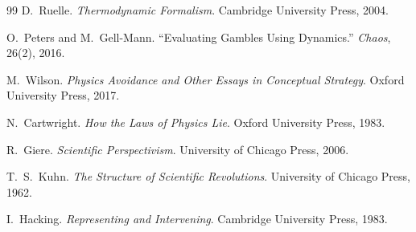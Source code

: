 \documentclass[12pt]{book}
\begin{document}
\begin{thebibliography}{99}
D.~Ruelle.
\textit{Thermodynamic Formalism}.
Cambridge University Press, 2004.

O.~Peters and M.~Gell-Mann.
``Evaluating Gambles Using Dynamics.''
\textit{Chaos}, 26(2), 2016.


M.~Wilson.
\textit{Physics Avoidance and Other Essays in Conceptual Strategy}.
Oxford University Press, 2017.

N.~Cartwright.
\textit{How the Laws of Physics Lie}.
Oxford University Press, 1983.

R.~Giere.
\textit{Scientific Perspectivism}.
University of Chicago Press, 2006.

T.~S.~Kuhn.
\textit{The Structure of Scientific Revolutions}.
University of Chicago Press, 1962.

I.~Hacking.
\textit{Representing and Intervening}.
Cambridge University Press, 1983.

\end{thebibliography}
\end{document}
